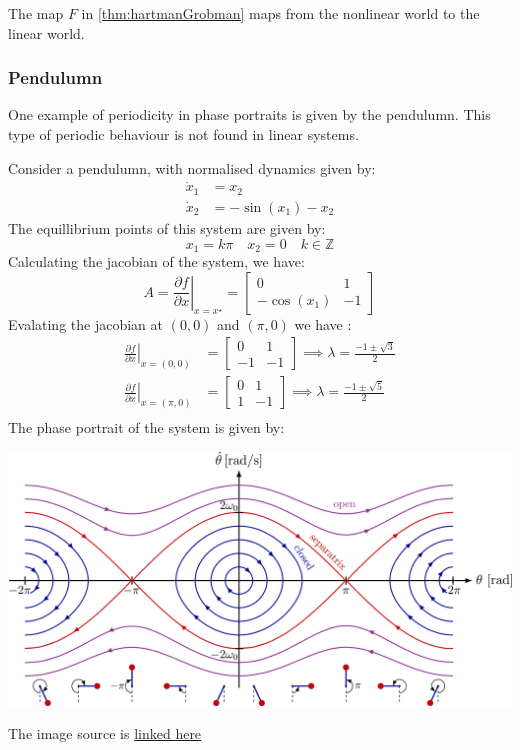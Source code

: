 The map \(F\) in \autoref{thm:hartmanGrobman} maps from the nonlinear world to the linear world. 
\subsubsection{Pendulumn}
One example of periodicity in phase portraits is given by the pendulumn. 
This type of periodic behaviour is not found in linear systems.
\begin{example}[Pendulumn]
    Consider a pendulumn, with normalised dynamics given by:
    \[
        \begin{aligned}
            \dot{x}_1 &= x_2  \\
            \dot{x}_2 &= -\sin(x_1) - x_2
        \end{aligned}
    \]
    The equillibrium points of this system are given by:
    \[
        x_1 = k\pi \quad x_2 = 0 \quad k\in\mathbb{Z}
    \]
    Calculating the jacobian of the system, we have:
    \[
        A = \left . \frac{\partial f}{\partial x} \right |_{x=x^{\star}} = \begin{bmatrix}
            0 & 1 \\
            -\cos(x_1) & -1
        \end{bmatrix}
    \]
    Evalating the jacobian at \((0,0)\) and \((\pi,0)\) we have :
    \[
        \begin{aligned}
            \left. \frac{\partial f}{\partial x} \right |_{x=(0,0)} &= \begin{bmatrix}
                0 & 1 \\
                -1 & -1
            \end{bmatrix} \implies \lambda = \frac{-1 \pm \sqrt{3}}{2} \\
            \left. \frac{\partial f}{\partial x} \right |_{x=(\pi,0)} &= \begin{bmatrix}
                0 & 1 \\
                1 & -1
            \end{bmatrix} \implies \lambda = \frac{-1 \pm \sqrt{5}}{2} \\
        \end{aligned}
    \]
    The phase portrait of the system is given by:
    \begin{center}
        \includegraphics[width=\linewidth]{figures/phaseportraits/pend.png}
    \end{center}
    The image source is \href{https://tikz.net/dynamics_phaseportrait/}{linked here}
\end{example}

